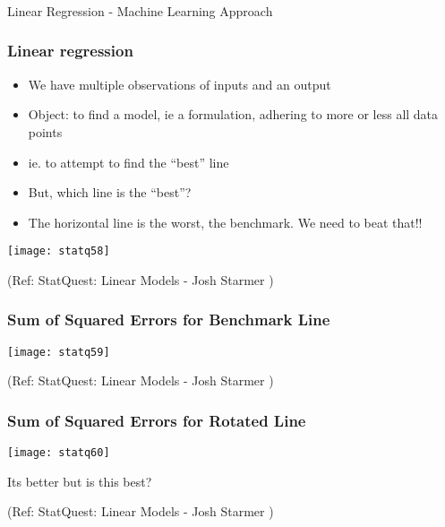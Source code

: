 

\begin{frame}[fragile]\frametitle{}
\begin{center}
{\Large Linear Regression - Machine Learning Approach}
\end{center}
\end{frame}


\begin{frame}[fragile]\frametitle{Linear regression}
	\begin{itemize}
	\item We have multiple observations of inputs and an output
	\item Object: to find a model, ie a formulation, adhering to more or less all data points
	\item ie. to attempt to find the ``best'' line
	\item But, which line is the ``best''?
	\item The horizontal line is the worst, the benchmark. We need to beat that!!
	\end{itemize}
	
\begin{center}
\texttt{[image: statq58]}
\end{center}
	
\tiny{(Ref: StatQuest: Linear Models - Josh Starmer )}	
\end{frame}

\begin{frame}[fragile]\frametitle{Sum of Squared Errors for Benchmark Line}
	
\begin{center}
\texttt{[image: statq59]}
\end{center}
	
\tiny{(Ref: StatQuest: Linear Models - Josh Starmer )}	
	
\end{frame}

\begin{frame}[fragile]\frametitle{Sum of Squared Errors for Rotated Line}
	
\begin{center}
\texttt{[image: statq60]}
\end{center}

Its better but is this best?

\tiny{(Ref: StatQuest: Linear Models - Josh Starmer )}	

\end{frame}

